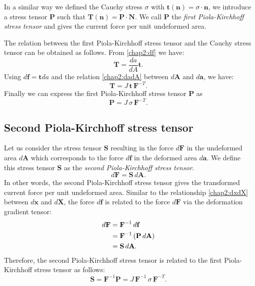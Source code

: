 In a similar way we defined the Cauchy stress $\sigma$ with $\mathbf{t}(\mathbf{n}) = \sigma \cdot \mathbf{n}$, we introduce a stress tensor $\mathbf{P}$ such that $\mathbf{T}(\mathbf{n}) = \mathbf{P} \cdot \mathbf{N}$. \ON We call $ \mathbf{P} $ the \emph{first Piola-Kirchhoff stress tensor} and \OFF gives the current force per unit undeformed area.

The relation between the first Piola-Kirchhoff stress tensor and the Cauchy stress tensor can be obtained as follows. From \eqref{chap2:df} we have:
\begin{equation}
\mathbf{T} = \frac{da}{dA} \mathbf{t}.
\end{equation}
Using $d\mathbf{f} = \mathbf{t} da$ and the relation \eqref{chap2:dadA} between $d\mathbf{A}$ and $d\mathbf{a}$, we have:
\begin{equation}
\mathbf{T} =  J \, \mathbf{t} \, \mathbf{F}^{-T}.
\end{equation}
Finally we can express the first Piola-Kirchhoff stress tensor $\mathbf{P}$ as
\begin{equation}
\mathbf{P} = J \, \sigma \, \mathbf{F}^{-T}.
\end{equation}
	
	
	\subsection{Second Piola-Kirchhoff stress tensor}\label{chap2:PiolaStress2}
\ON Let us consider the stress tensor $\mathbf{S}$ resulting in the force $d\mathbf{F}$ in the undeformed area $d\mathbf{A}$ which \OFF corresponds to the force $d\mathbf{f}$ in the deformed area $d\mathbf{a}$. \ON We define this stress tensor $\mathbf{S}$ as the \emph{second Piola-Kirchhoff stress tensor}. \OFF
\begin{equation}
d\mathbf{F} = \mathbf{S} \, d\mathbf{A}.
\end{equation}
\ON In other words, \OFF the second Piola-Kirchhoff stress tensor gives the transformed current force per unit undeformed area. Similar to the relationship \eqref{chap2:dxdX} between $d\mathbf{x}$ and $d\mathbf{X}$, the force $d\mathbf{f}$ is related to the force $d\mathbf{F}$ via the deformation gradient tensor:
\begin{align}
d\mathbf{F} &= \mathbf{F}^{-1} \, d\mathbf{f} \notag \\
&= \mathbf{F}^{-1} \, (\mathbf{P} \, d\mathbf{A}) \notag \\
&= \mathbf{S} \, d\mathbf{A}.
\end{align}
Therefore, the second Piola-Kirchhoff stress tensor is related to the first Piola-Kirchhoff stress tensor as follows:
\begin{equation}
\mathbf{S} = \mathbf{F}^{-1} \mathbf{P} = J \, \mathbf{F}^{-1} \, \sigma \, \mathbf{F}^{-T}.
\end{equation}
	
